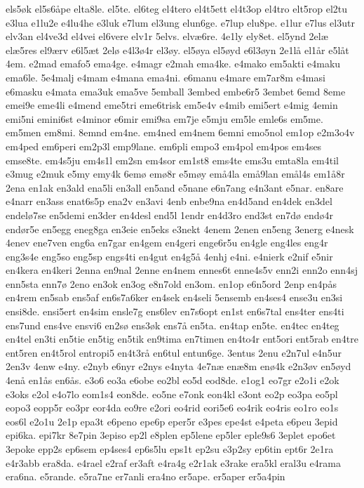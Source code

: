 {els5øk
el5s6åpe
elta8le.
el5te.
el6teg
el4tero
el4t5ett
el4t3op
el4tro
elt5rop
el2tu
e3lua
e1lu2e
e4lu4he
e3luk
e7lum
el3ung
elun6ge.
e7lup
elu8pe.
e1lur
e7lus
el3utr
elv3an
el4ve3d
el4vei
el6vere
elv1r
5elvs.
elvæ6re.
4e1ly
ely8et.
el5ynd
2elæ
elæ5res
el9ærv
e6l5æt
2elø
e4l3ø4r
el3øy.
el5øya
el5øyd
e6l3øyn
2e1lå
el1år
e5låt
4em.
e2mad
emafo5
ema4ge.
e4magr
e2mah
ema4ke.
e4mako
em5akti
e4maku
ema6le.
5e4malj
e4mam
e4mana
ema4ni.
e6manu
e4mare
em7ar8m
e4masi
e6masku
e4mata
ema3uk
ema5ve
5emball
3embed
embe6r5
3embet
6emd
8eme
emei9e
eme4li
e4mend
eme5tri
eme6trisk
em5e4v
e4mib
emi5ert
e4mig
4emin
emi5ni
emini6st
e4minor
e6mir
emi9sa
em7je
e5mju
em5le
emle6s
em5me.
em5men
em8mi.
8emnd
em4ne.
em4ned
em4nem
6emni
emo5nol
em1op
e2m3o4v
em4ped
em6peri
em2p3l
emp9lane.
em6pli
empo3
em4pol
em4pos
em4ses
emse8te.
em4s5ju
em4s1l
em2sn
em4sor
em1st8
ems4te
ems3u
emta8la
em4til
e3mug
e2muk
e5my
emy4k
6emø
emø8r
e5møy
emå4la
emå9lan
emål4s
em1å8r
2ena
en1ak
en3ald
ena5li
en3all
en5and
e5nane
e6n7ang
e4n3ant
e5nar.
en8are
e4narr
en3ass
enat6s5p
ena2v
en3avi
4enb
enbe9na
en4d5and
en4dek
en3del
endelø7se
en5demi
en3der
en4desl
end5l
1endr
en4d3ro
end3st
en7dø
endø4r
endør5e
en5egg
eneg8ga
en3eie
en5eks
e3nekt
4enem
2enen
en5eng
3energ
e4nesk
4enev
ene7ven
eng6a
en7gar
en4gem
en4geri
enge6r5u
en4gle
eng4les
eng4r
eng3s4e
eng5so
eng5sp
engs4ti
en4gut
en4g5å
4enhj
e4ni.
e4nierk
e2nif
e5nir
en4kera
en4keri
2enna
en9nal
2enne
en4nem
ennes6t
enne4s5v
enn2i
enn2o
enn4sj
enn5sta
enn7ø
2eno
en3ok
en3og
e8n7old
en3om.
en1op
e6n5ord
2enp
en4pås
en4rem
en5sab
ens5af
en6s7a6ker
en4sek
en4seli
5ensemb
en4ses4
ense3u
en3si
ensi8de.
ensi5ert
en4sim
ensle7g
ens6lev
en7s6opt
en1st
en6s7tal
ens4ter
ens4ti
ens7und
ens4ve
ensvi6
en2sø
ens3øk
ens7å
en5ta.
en4tap
en5te.
en4tec
en4teg
en4tel
en3ti
en5tie
en5tig
en5tik
en9tima
en7timen
en4to4r
ent5ori
ent5rab
en4tre
ent5ren
en4t5rol
entropi5
en4t3rå
en6tul
entun6ge.
3entus
2enu
e2n7ul
e4n5ur
2en3v
4enw
e4ny.
e2nyb
e6nyr
e2nys
e4nyta
4e7næ
enæ8m
enø4k
e2n3øv
en5øyd
4enå
en1ås
en6ås.
e3o6
eo3a
e6obe
eo2bl
eo5d
eod8de.
e1og1
eo7gr
e2o1i
e2ok
e3oks
e2ol
e4o7lo
eom1s4
eon8de.
eo5ne
e7onk
eon4kl
e3ont
eo2p
eo3pa
eo5pl
eopo3
eopp5r
eo3pr
eor4da
eo9re
e2ori
eo4rid
eori5e6
eo4rik
eo4ris
eo1ro
eo1s
eos6l
e2o1u
2e1p
epa3t
e6peno
epe6p
eper5r
e3pes
epe4st
e4peta
e6peu
3epid
epi6ka.
epi7kr
8e7pin
3episo
ep2l
e8plen
ep5lene
ep5ler
eple9s6
3eplet
epo6et
3epoke
epp2s
ep6sem
ep4ses4
ep6s5lu
eps1t
ep2su
e3p2sy
ep6tin
ept6r
2e1ra
e4r3abb
era8da.
e4rael
e2raf
er3aft
e4ra4g
e2r1ak
e3rake
era5kl
eral3u
e4rama
era6na.
e5rande.
e5ra7ne
er7anli
era4no
er5ape.
er5aper
er5a4pin
}
